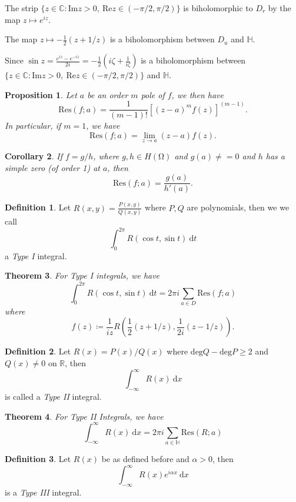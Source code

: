 \documentclass[letterpaper,12pt]{article}
\theoremstyle{definition}
\newtheorem{definition}{Definition}[section]
\theoremstyle{plain}
\newtheorem{thm}{Theorem}[section]
\newtheorem{proposition}[thm]{Proposition}
\newtheorem{corollary}[thm]{Corollary}
\theoremstyle{remark}
\newcommand{\R}{\mathbb{R}}
\newcommand{\C}{\mathbb{C}}
\let\oldOmega\Omega
\renewcommand{\Omega}{\mathrm{\oldOmega}}
\begin{document}
The strip $\{z\in\C:\mathrm{Im} z>0,\ \mathrm{Re}z\in(-\pi/2,\pi/2)\}$ is biholomorphic to $D_r$ by the map $z\mapsto e^{iz}$.

The map $z\mapsto -\frac12(z+1/z)$ is a biholomorphism between $D_u$ and $\mathbb{H}$.

Since $\sin z = \frac{e^{iz}-e^{-iz}}{2i} = -\frac12(i\zeta+\frac{1}{i\zeta})$ is a biholomorphism between $\{z\in\C:\mathrm{Im} z>0,\ \mathrm{Re}z\in(-\pi/2,\pi/2)\}$ and $\mathbb{H}$.

\begin{proposition}
Let $a$ be an order $m$ pole of $f$, we then have
\[\mathrm{Res}(f;a) = \frac{1}{(m-1)!}[(z-a)^mf(z)]^{(m-1)}.\]
In particular, if $m=1$, we have
\[\mathrm{Res}(f;a) = \lim_{z\to a}(z-a)f(z).\]
\end{proposition}

\begin{corollary}
If $f=g/h$, where $g,h\in H(\Omega)$ and $g(a)\ne =0$ and $h$ has a simple zero (of order 1) at $a$, then
\[\mathrm{Res}(f;a) = \frac{g(a)}{h'(a)}.\]
\end{corollary}

\begin{definition}
Let $R(x,y) = \frac{P(x,y)}{Q(x,y)}$ where $P,Q$ are polynomials, then we we call
\[\int_0^{2\pi} R(\cos t,\sin t)\ \mathrm{d}t\]
a \emph{Type I} integral.
\end{definition}

\begin{thm}
For Type I integrals, we have
\[\int_0^{2\pi} R(\cos t,\sin t)\ \mathrm{d}t = 2\pi i\sum_{a\in D}\mathrm{Res}(f; a)\]
where
\[f(z)\coloneqq \frac{1}{iz} R\left(\frac12(z+1/z),\frac{1}{2i}(z-1/z)\right).\]
\end{thm}

\begin{definition}
Let $R(x) = P(x)/Q(x)$ where $\mathrm{deg} Q - \mathrm{deg} P\geq 2$ and $Q(x)\ne 0$ on $\R$, then
\[\int_{-\infty}^\infty R(x)\ \mathrm{d}x\]
is called a \emph{Type II} integral.
\end{definition}

\begin{thm}
For Type II Integrals, we have
\[\int_{-\infty}^\infty R(x)\ \mathrm{d}x = 2\pi i \sum_{a\in \mathbb{H}}\mathrm{Res}(R;a)\]
\end{thm}

\begin{definition}
Let $R(x)$ be as defined before and $\alpha> 0$, then
\[\int_{-\infty}^\infty R(x)e^{i\alpha x}\ \mathrm{d}x\]
is a \emph{Type III} integral.
\end{definition}
\end{document}
